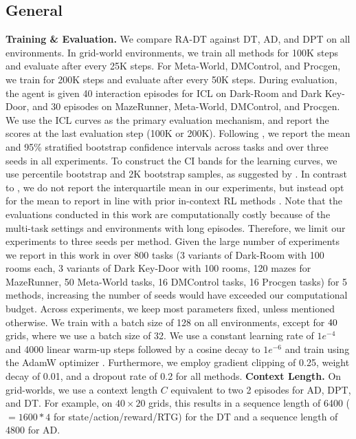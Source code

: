 \documentclass{article}
\begin{document}
\subsection{General}\label{appendix:general}
\textbf{Training \& Evaluation.}
We compare RA-DT against DT, AD, and DPT on all environments.
In grid-world environments, we train all methods for 100K steps and evaluate after every 25K steps.
For Meta-World, DMControl, and Procgen, we train for 200K steps and evaluate after every 50K steps.
During evaluation, the agent is given 40 interaction episodes for ICL on Dark-Room and Dark Key-Door, and 30 episodes on MazeRunner, Meta-World, DMControl, and Procgen.
We use the ICL curves as the primary evaluation mechanism, and report the scores at the last evaluation step (100K or 200K).
Following \citet{Agarwal:21}, we report the mean and 95\% stratified bootstrap confidence intervals across tasks and over three seeds in all experiments.
To construct the CI bands for the learning curves, we use percentile bootstrap and 2K bootstrap samples, as suggested by \cite{Agarwal:21}.
In contrast to \citet{Agarwal:21}, we do not report the interquartile mean in our experiments, but instead opt for the mean to report in line with prior in-context RL methods \citep{Laskin:22,Lee:23}.
Note that the evaluations conducted in this work are computationally costly because of the multi-task settings and environments with long episodes.
Therefore, we limit our experiments to three seeds per method.
Given the large number of experiments we report in this work in over 800 tasks (3 variants of Dark-Room with 100 rooms each, 3 variants of Dark Key-Door with 100 rooms, 120 mazes for MazeRunner, 50 Meta-World tasks, 16 DMControl tasks, 16 Procgen tasks) for 5 methods, increasing the number of seeds would have exceeded our computational budget.
Across experiments, we keep most parameters fixed, unless mentioned otherwise.
We train with a batch size of 128 on all environments, except for $40\time20$ grids, where we use a batch size of 32.
We use a constant learning rate of $1e^{-4}$ and 4000 linear warm-up steps followed by a cosine decay to $1e^{-6}$ and train using the AdamW optimizer \citep{Loshchilov:18}.
Furthermore, we employ gradient clipping of 0.25, weight decay of 0.01, and a dropout rate of 0.2 for all methods.
\textbf{Context Length.}
On grid-worlds, we use a context length $C$ equivalent to two 2 episodes for AD, DPT, and DT.
For example, on $40\times20$ grids, this results in a sequence length of 6400 ($=1600 * 4$ for state/action/reward/RTG) for the DT and a sequence length of 4800 for AD.
\end{document}
